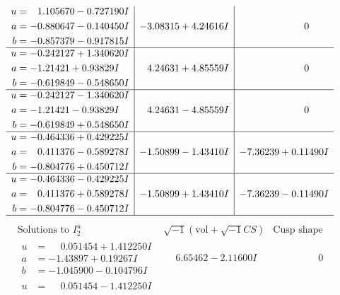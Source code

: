 \documentclass[1p]{elsarticle_modified}
\theoremstyle{definition}
\newcommand{\I}{\sqrt{-1}}
\begin{document}
$$\begin{array}{c|c|c}
\begin{aligned}
u &= \phantom{-}1.105670 - 0.727190 I \\
a &= -0.880647 - 0.140450 I \\
b &= -0.857379 - 0.917815 I\end{aligned}
 & -3.08315 + 4.24616 I & \phantom{-0.000000 } 0 \\ \hline\begin{aligned}
u &= -0.242127 + 1.340620 I \\
a &= -1.21421 + 0.93829 I \\
b &= -0.619849 - 0.548650 I\end{aligned}
 & \phantom{-}4.24631 + 4.85559 I & \phantom{-0.000000 } 0 \\ \hline\begin{aligned}
u &= -0.242127 - 1.340620 I \\
a &= -1.21421 - 0.93829 I \\
b &= -0.619849 + 0.548650 I\end{aligned}
 & \phantom{-}4.24631 - 4.85559 I & \phantom{-0.000000 } 0 \\ \hline\begin{aligned}
u &= -0.464336 + 0.429225 I \\
a &= \phantom{-}0.411376 - 0.589278 I \\
b &= -0.804776 + 0.450712 I\end{aligned}
 & -1.50899 - 1.43410 I & -7.36239 + 0.11490 I \\ \hline\begin{aligned}
u &= -0.464336 - 0.429225 I \\
a &= \phantom{-}0.411376 + 0.589278 I \\
b &= -0.804776 - 0.450712 I\end{aligned}
 & -1.50899 + 1.43410 I & -7.36239 - 0.11490 I\\
 \hline 
 \end{array}$$\newpage$$\begin{array}{c|c|c}  
\text{Solutions to }I^u_{2}& \I (\text{vol} + \sqrt{-1}CS) & \text{Cusp shape}\\
 \hline 
\begin{aligned}
u &= \phantom{-}0.051454 + 1.412250 I \\
a &= -1.43897 + 0.19267 I \\
b &= -1.045900 - 0.104796 I\end{aligned}
 & \phantom{-}6.65462 - 2.11600 I & \phantom{-0.000000 } 0 \\ \hline\begin{aligned}
u &= \phantom{-}0.051454 - 1.412250 I \\

\end{aligned}
\end{array}$$
\end{document}
